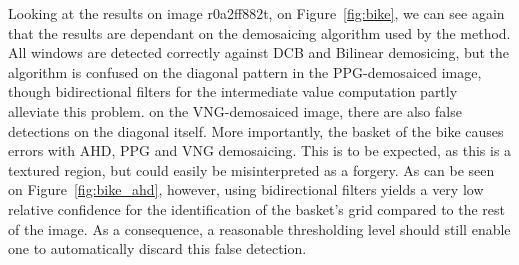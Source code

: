\documentclass{ipol}
\begin{document}
Looking at the results on image r0a2ff882t, on Figure~\ref{fig:bike}, we can see again that the results are dependant on the demosaicing algorithm used by the method. All windows are detected correctly against DCB and Bilinear demosicing, but the algorithm is confused on the diagonal pattern in the PPG-demosaiced image, though bidirectional filters for the intermediate value computation partly alleviate this problem. on the VNG-demosaiced image, there are also false detections on the diagonal itself. More importantly, the basket of the bike causes errors with AHD, PPG and VNG demosaicing. This is to be expected, as this is a textured region, but could easily be misinterpreted as a forgery.
As can be seen on Figure~\ref{fig:bike_ahd}, however, using bidirectional filters yields a very low relative confidence for the identification of the basket's grid compared to the rest of the image. As a consequence, a reasonable thresholding level should still enable one to automatically discard this false detection.
\end{document}
